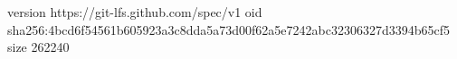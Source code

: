 version https://git-lfs.github.com/spec/v1
oid sha256:4bcd6f54561b605923a3c8dda5a73d00f62a5e7242abc32306327d3394b65cf5
size 262240
